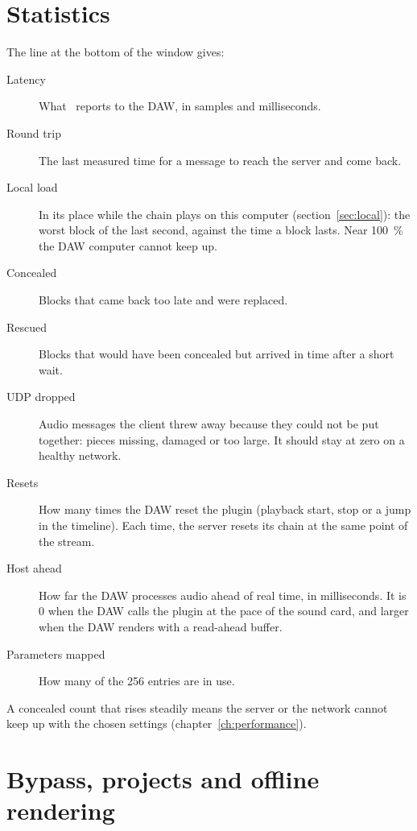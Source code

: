 \section{Statistics}
\label{sec:stats}

The line at the bottom of the window gives:

\begin{description}
  \item[Latency] What \fxme\ reports to the DAW, in samples and milliseconds.
  \item[Round trip] The last measured time for a message to reach the server
    and come back.
  \item[Local load] In its place while the chain plays on this computer
    (section~\ref{sec:local}): the worst block of the last second, against
    the time a block lasts. Near 100~\% the DAW computer cannot keep up.
  \item[Concealed] Blocks that came back too late and were replaced.
  \item[Rescued] Blocks that would have been concealed but arrived in time
    after a short wait.
  \item[UDP dropped] Audio messages the client threw away because they could not be put together: pieces missing, damaged or too large. It should stay at zero on a healthy network.
  \item[Resets] How many times the DAW reset the plugin (playback start, stop or a jump in the timeline). Each time, the server resets its chain at the same point of the stream.
  \item[Host ahead] How far the DAW processes audio ahead of real time, in milliseconds. It is 0 when the DAW calls the plugin at the pace of the sound card, and larger when the DAW renders with a read-ahead buffer.
  \item[Parameters mapped] How many of the 256 entries are in use.
\end{description}

A concealed count that rises steadily means the server or the network cannot
keep up with the chosen settings (chapter~\ref{ch:performance}).

\section{Bypass, projects and offline rendering}

